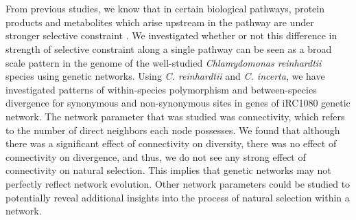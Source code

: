 \documentclass[letterpaper, 10 pt, conference]{ieeeconf}  %
\begin{document}
\section*{}
From previous studies, we know that in certain biological pathways, protein products and metabolites which arise upstream in the pathway are under stronger selective constraint \cite{rmt99}. We investigated whether or not this difference in strength of selective constraint along a single pathway can be seen as a broad scale pattern in the genome of the well-studied \textit{Chlamydomonas reinhardtii} species using genetic networks. Using \textit{C. reinhardtii} and \textit{C. incerta}, we have investigated patterns of within-species polymorphism and between-species divergence for synonymous and non-synonymous sites in genes of iRC1080 genetic network. The network parameter that was studied was connectivity, which refers to the number of direct neighbors each node possesses. We found that although there was a significant effect of connectivity on diversity, there was no effect of connectivity on divergence, and thus, we do not see any strong effect of connectivity on natural selection. This implies that genetic networks may not perfectly reflect network evolution. Other network parameters could be studied to potentially reveal additional insights into the process of natural selection within a network. 









\addtolength{\textheight}{-12cm}   %







\end{document}
